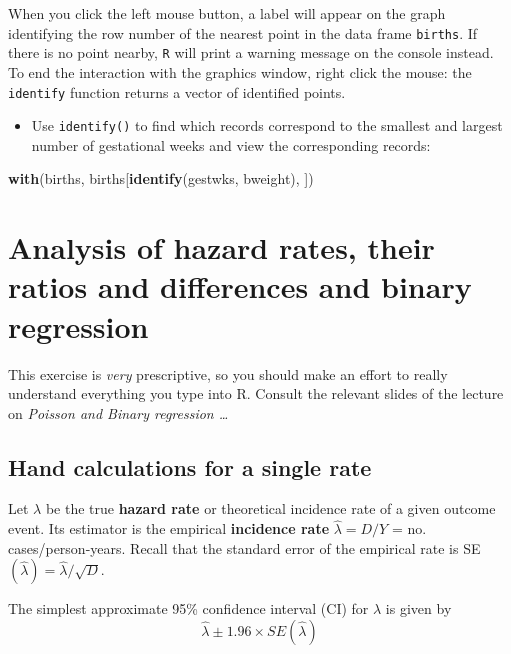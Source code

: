 \documentclass[
]{book}
\newenvironment{Shaded}{\begin{snugshade}}{\end{snugshade}}
\newcommand{\FunctionTok}[1]{\textcolor[rgb]{0.13,0.29,0.53}{\textbf{#1}}}
\newcommand{\NormalTok}[1]{#1}
\providecommand{\tightlist}{%
  \setlength{\itemsep}{0pt}\setlength{\parskip}{0pt}}
\begin{document}
When you click the left mouse button, a label will appear on the graph
identifying the row number of the nearest point in the data frame
\texttt{births}. If there is no point nearby, \texttt{R} will print a warning
message on the console instead. To end the interaction with the
graphics window, right click the mouse: the \texttt{identify} function
returns a vector of identified points.

\begin{itemize}
\tightlist
\item
  Use \texttt{identify()} to find which records correspond to the
  smallest and largest number of gestational weeks and view the
  corresponding records:
\end{itemize}

\begin{Shaded}
\begin{Highlighting}[]
\FunctionTok{with}\NormalTok{(births, births[}\FunctionTok{identify}\NormalTok{(gestwks, bweight), ])}
\end{Highlighting}
\end{Shaded}

\chapter{Analysis of hazard rates, their ratios and differences and binary regression}\label{analysis-of-hazard-rates-their-ratios-and-differences-and-binary-regression}

This exercise is \emph{very} prescriptive, so you should make an
effort to really understand everything you type into R. Consult the
relevant slides of the lecture on \emph{Poisson and Binary regression \ldots{}}

\section{Hand calculations for a single rate}\label{hand-calculations-for-a-single-rate}

Let \(\lambda\) be the true \textbf{hazard rate} or theoretical incidence rate of a given outcome event.
Its estimator is the empirical \textbf{incidence rate}
\(\widehat\lambda = D/Y\) = no. cases/person-years. Recall that the
standard error of the empirical rate is
SE\((\widehat\lambda) = \widehat\lambda/\sqrt{D}\).

The simplest approximate 95\% confidence interval (CI) for \(\lambda\)
is given by
\[ \widehat\lambda \pm 1.96 \times SE(\widehat\lambda) \]
\end{document}

